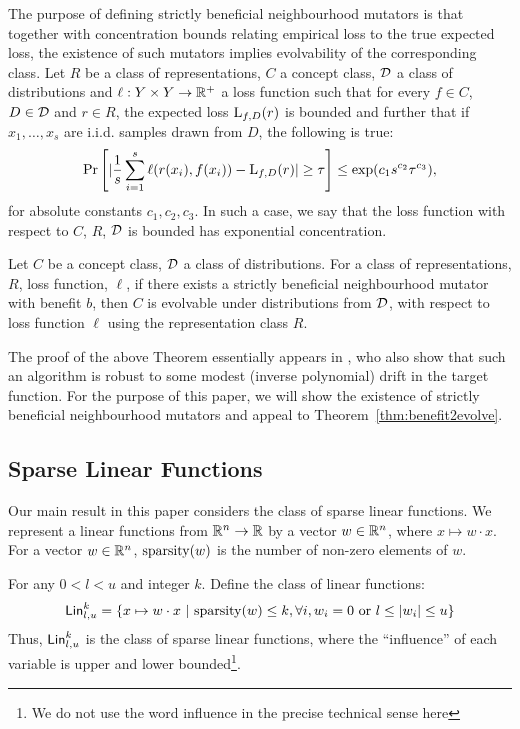 The purpose of defining strictly beneficial neighbourhood mutators is that
together with concentration bounds relating empirical loss to the true expected
loss, the existence of such mutators implies evolvability of the corresponding
class. Let $R$ be a class of representations, $C$ a concept class, ${\mathcal D}$ a
class of distributions and $\ell : Y \times Y \rightarrow \mathbb{R}^+$ a loss
function such that for every $f \in C$, $D \in {\mathcal D}$ and $r \in R$, the
expected loss $\mathrm{L}_{f, D}(r)$ is bounded and further that if $x_1, \ldots,
x_s$ are i.i.d. samples drawn from $D$, the following is true:
%
\[ \Pr\left[ |\frac{1}{s} \sum_{i=1}^s \ell(r(x_i), f(x_i)) - \mathrm{L}_{f, D}(r)|
\geq \tau \right] \leq \exp(c_1 s^{c_2} \tau^{c_3}), \]
%
for absolute constants $c_1, c_2, c_3$. In such a case, we say that the loss
function with respect to $C$, $R$, ${\mathcal D}$ is bounded has exponential
concentration. 

\begin{theorem} \label{thm:benefit2evolve}
Let $C$ be a concept class, ${\mathcal D}$ a class of distributions. For a class of
representations, $R$, loss function, $\ell$, if there exists a strictly
beneficial neighbourhood mutator with benefit $b$, then $C$ is evolvable under
distributions from ${\mathcal D}$, with respect to loss function $\ell$ using the
representation class $R$.  \end{theorem}

The proof of the above Theorem essentially appears in \cite{KVV:2010-drift}, who
also show that such an algorithm is robust to some modest (inverse polynomial)
drift in the target function. For the purpose of this paper, we will show the
existence of strictly beneficial neighbourhood mutators and appeal to
Theorem~\ref{thm:benefit2evolve}.

\subsection{Sparse Linear Functions} 

Our main result in this paper considers the class of sparse linear functions.
We represent a linear functions from $\mathbb{R}^n \rightarrow \mathbb{R}$ by a vector
$w \in \mathbb{R}^n$, where $x \mapsto w \cdot x$.  For a vector $w \in \mathbb{R}^n$,
$\mathrm{sparsity}(w)$ is the number of non-zero elements of $w$. 

For any $0 < l < u$ and integer $k$. Define the class of linear functions:
\[
\mathsf{Lin}^k_{l, u} = \{ x \mapsto w \cdot x ~|~ \mathrm{sparsity}(w) \leq k, \forall i,
w_i = 0 \mbox{ or } l \leq |w_i| \leq u \}
\]
Thus, $\mathsf{Lin}^k_{l, u}$ is the class of sparse linear functions, where the
``influence'' of each variable is upper and lower bounded\footnote{We do not use
the word influence in the precise technical sense here}.

